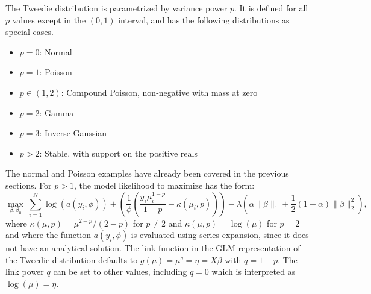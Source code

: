 The Tweedie distribution is parametrized by variance power $p$. It is defined for all $p$ values except in the $(0,1)$ interval, and has the following distributions as special cases.

\begin{itemize}
\item  $p=0$: Normal
\item  $p=1$: Poisson
\item $p\in(1, 2)$: Compound Poisson, non-negative with mass at zero
\item $p=2$: Gamma
\item $p=3$: Inverse-Gaussian
\item $p>2$:  Stable, with support on the positive reals %
\end{itemize}

\newpage
\waterExampleInR


\medskip
\waterExampleInPython


The normal and Poisson examples have already been covered in the previous sections. For $p>1$, the model likelihood to maximize has the form: 
$$  \max_{\beta,\beta_0} \ \sum_{i=1}^N \log(a(y_i,\phi)) + \left( \frac{1}{\phi}\left( \frac{y_i\mu_i^{1-p}}{1-p} - \kappa(\mu_i,p) \right)  \right) -\lambda  \left(  \alpha \| \beta \|_1 + \frac{1}{2}(1-\alpha)\| \beta \|_2^2  \right), $$
where $\kappa(\mu,p) = \mu^{2-p}/(2-p)$ for $p \neq 2$ and $\kappa(\mu,p) = \log(\mu)$ for $p=2$ and where the function $a(y_i,\phi)$ is evaluated using series expansion, since it does not have an analytical solution. The link function in the GLM representation of the Tweedie distribution defaults to $g(\mu) = \mu^{q} = \eta = X\beta$ with $q=1-p$. The link power $q$ can be set to other values, including $q=0$ which is interpreted as $\log(\mu)=\eta$. 
%

